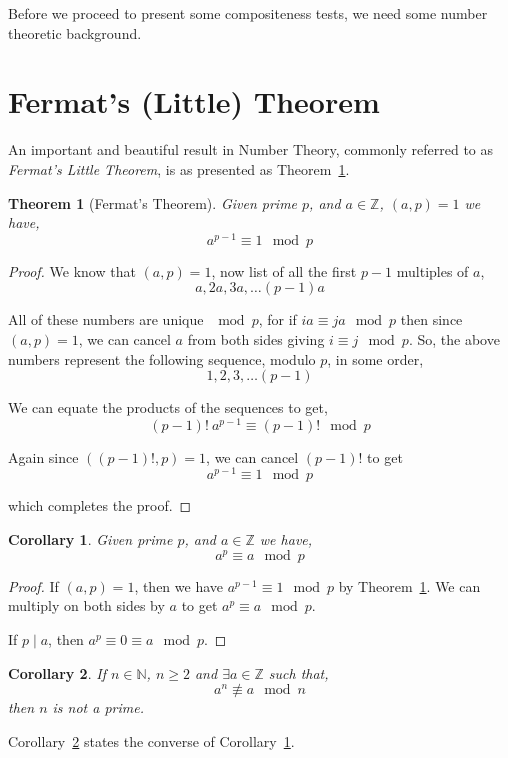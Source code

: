 \documentclass[11pt]{report}
\newtheorem{theorem}{Theorem}[section]
\newtheorem{corollary}{Corollary}[theorem]
\begin{document}
Before we proceed to present some compositeness tests, we need some number theoretic background.

\section{Fermat's (Little) Theorem}

An important and beautiful result in Number Theory, commonly referred to as \emph{Fermat's Little Theorem}, is as presented as Theorem~\ref{theorem:FermatLittleTheorem}.

\begin{theorem}[Fermat's Theorem]
\label{theorem:FermatLittleTheorem}
Given prime $p$, and $a \in \mathbb{Z}$, $(a,p) = 1$ we have,
\[ a^{p-1} \equiv 1 \mod p \]
\end{theorem}

\begin{proof}
We know that $(a,p) = 1$, now list of all the first $p-1$ multiples of $a$,
\[ a, 2a, 3a, \dots (p-1)a\]

All of these numbers are unique $\mod p$, for if $ia \equiv ja \mod p$ then since $(a,p) = 1$, we can cancel $a$ from both sides giving $i \equiv j \mod p$. So, the above numbers represent the following sequence, modulo $p$, in some order,
\[ 1, 2, 3, \dots (p-1)\]

We can equate the products of the sequences to get, 
\[(p-1)!\ a^{p -1}\equiv (p-1)! \mod p\]

Again since $((p-1)!,p) = 1$, we can cancel $(p-1)!$ to get
\[a^{p-1} \equiv 1 \mod p\]

which completes the proof.
\end{proof}

\begin{corollary}
\label{corollary:BetterFermatLittleTheorem}
Given prime $p$, and $a \in \mathbb{Z}$ we have,
\[ a^p \equiv a \mod p \]
\end{corollary}
 
\begin{proof}
If $(a,p) = 1$, then we have $a^{p-1} \equiv 1 \mod p$ by Theorem~\ref{theorem:FermatLittleTheorem}. We can multiply on both sides by $a$ to get $a^p \equiv a \mod p$.

If $p \mid a$, then $a^p \equiv 0 \equiv a \mod p$. 
\end{proof}

\begin{corollary}
\label{corollary:FermatLittleTheoremConverse}
If $n \in \mathbb{N}$, $n \geq 2$ and $\exists a \in \mathbb{Z}$ such that,
\[a^n \not\equiv a \mod n\]
then $n$ is not a prime.  
\end{corollary}
Corollary~\ref{corollary:FermatLittleTheoremConverse} states the converse of Corollary~\ref{corollary:BetterFermatLittleTheorem}.
\end{document}
